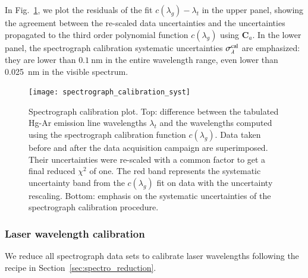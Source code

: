In Fig.~\ref{fig:spectro_calib_syst}, we plot the residuals of the fit $c(\lambda_g)-\lambda_t$ in the upper panel, showing the agreement between the re-scaled data uncertainties and the uncertainties propagated to the third order polynomial function $c(\lambda_g)$ using $\mathbf{C}_a$. In the lower panel, the spectrograph calibration systematic uncertainties $\sigma_\lambda^{\rm cal}$ are emphasized: they are lower than $\SI{0.1}{\nm}$ in the entire wavelength range, even lower than \SI{0.025}{\nm} in the visible spectrum.


\begin{figure}%
\centering
\texttt{[image: spectrograph\_calibration\_syst]}
\caption{Spectrograph calibration plot. Top: difference between the tabulated Hg-Ar emission line wavelengths $\lambda_t$ and the wavelengths computed using the spectrograph calibration function $c(\lambda_g)$. Data taken before and after the data acquisition campaign are superimposed. Their uncertainties were re-scaled with a common factor to get a final reduced $\chi^2$ of one. The red band represents the systematic uncertainty band from the $c(\lambda_g)$ fit on data with the uncertainty rescaling. Bottom: emphasis on the systematic uncertainties of the spectrograph calibration procedure.}\label{fig:spectro_calib_syst}
\end{figure}


\subsubsection{Laser wavelength calibration}


We reduce all spectrograph data sets to calibrate laser wavelengths following the recipe in Section~\ref{sec:spectro_reduction}.

